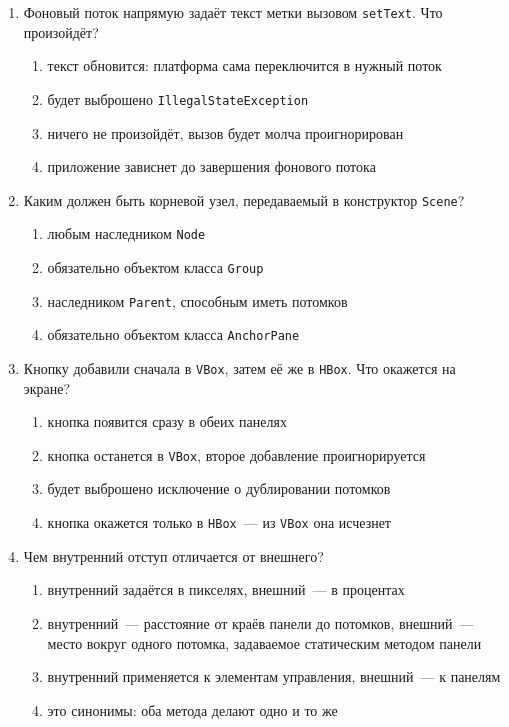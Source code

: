 \begin{enumerate}
\item Фоновый поток напрямую задаёт текст метки вызовом \texttt{setText}. Что
      произойдёт?
  \begin{enumerate}
    \item[а)] текст обновится: платформа сама переключится в нужный поток
    \item[б)] будет выброшено \texttt{IllegalStateException}
    \item[в)] ничего не произойдёт, вызов будет молча проигнорирован
    \item[г)] приложение зависнет до завершения фонового потока
  \end{enumerate}

\item Каким должен быть корневой узел, передаваемый в конструктор
      \texttt{Scene}?
  \begin{enumerate}
    \item[а)] любым наследником \texttt{Node}
    \item[б)] обязательно объектом класса \texttt{Group}
    \item[в)] наследником \texttt{Parent}, способным иметь потомков
    \item[г)] обязательно объектом класса \texttt{AnchorPane}
  \end{enumerate}

\item Кнопку добавили сначала в \texttt{VBox}, затем её же в \texttt{HBox}. Что
      окажется на экране?
  \begin{enumerate}
    \item[а)] кнопка появится сразу в обеих панелях
    \item[б)] кнопка останется в \texttt{VBox}, второе добавление
              проигнорируется
    \item[в)] будет выброшено исключение о дублировании потомков
    \item[г)] кнопка окажется только в \texttt{HBox}~--- из \texttt{VBox} она
              исчезнет
  \end{enumerate}

\item Чем внутренний отступ отличается от внешнего?
  \begin{enumerate}
    \item[а)] внутренний задаётся в пикселях, внешний~--- в процентах
    \item[б)] внутренний~--- расстояние от краёв панели до потомков,
              внешний~--- место вокруг одного потомка, задаваемое статическим
              методом панели
    \item[в)] внутренний применяется к элементам управления, внешний~--- к
              панелям
    \item[г)] это синонимы: оба метода делают одно и то же
  \end{enumerate}


\end{enumerate}

